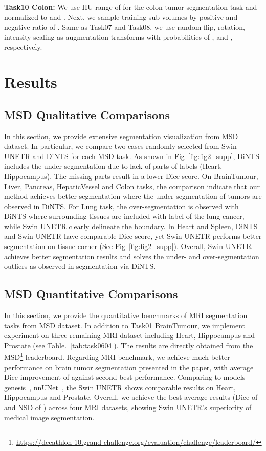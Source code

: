 \documentclass[10pt,twocolumn,letterpaper]{article}
\begin{document}
\noindent\textbf{Task10 Colon: } We use HU range of  for the colon tumor segmentation task and normalized to  and . Next, we sample training sub-volumes by positive and negative ratio of . Same as Task07 and Task08, we use random flip, rotation, intensity scaling as augmentation transforms with probabilities of ,  and , respectively. 




\section{Results}
\label{sec:msd_bench}
\subsection{MSD Qualitative Comparisons}
In this section, we provide extensive segmentation visualization from MSD dataset. In particular, we compare two cases randomly selected from Swin UNETR and DiNTS for each MSD task. As shown in Fig~\ref{fig:fig2_supp}, DiNTS includes the under-segmentation due to lack of parts of labels (Heart, Hippocampus). The missing parts result in a lower Dice score. On BrainTumour, Liver, Pancreas, HepaticVessel and Colon tasks, the comparison indicate that our method achieves better segmentation where the under-segmentation of tumors are observed in DiNTS. For Lung task, the over-segmentation is observed with DiNTS where surrounding tissues are included with label of the lung cancer, while Swin UNETR clearly delineate the boundary. In Heart and Spleen, DiNTS and Swin UNETR have comparable Dice score, yet Swin UNETR performs better segmentation on tissue corner (See Fig~\ref{fig:fig2_supp}). Overall, Swin UNETR achieves better segmentation results and solves the under- and over-segmentation outliers as observed in segmentation via DiNTS. 


\subsection{MSD Quantitative Comparisons}
In this section, we provide the quantitative benchmarks of MRI segmentation tasks from MSD dataset. In addition to Task01 BrainTumour, we implement experiment on three remaining MRI dataset including Heart, Hippocampus and Prostate (see Table.~\ref{tab:task0604}). The results are directly obtained from the MSD\footnote{{\url{https://decathlon-10.grand-challenge.org/evaluation/challenge/leaderboard/}}} leaderboard. Regarding MRI benchmark, we achieve much better performance on brain tumor segmentation presented in the paper, with  average Dice improvement of  against second best performance. Comparing to models genesis~\cite{zhou2021models}, nnUNet~\cite{isensee2021nnu}, the Swin UNETR shows comparable results on Heart, Hippocampus and Prostate. Overall, we achieve the best average results (Dice of  and NSD of ) across four MRI datasets, showing Swin UNETR's superiority of medical image segmentation.
\end{document}
